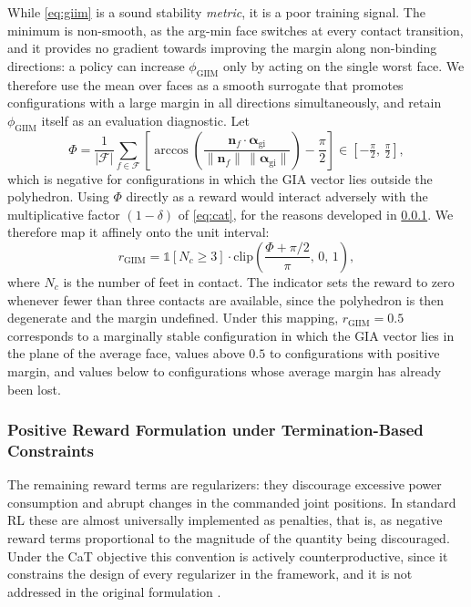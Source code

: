 While \cref{eq:giim} is a sound stability \emph{metric}, it is a poor training signal. The minimum is non-smooth, as the arg-min face switches at every contact transition, and it provides no gradient towards improving the margin along non-binding directions: a policy can increase $\phi_{\text{GIIM}}$ only by acting on the single worst face. We therefore use the mean over faces as a smooth surrogate that promotes configurations with a large margin in all directions simultaneously, and retain $\phi_{\text{GIIM}}$ itself as an evaluation diagnostic. Let
%
\begin{equation}
    \Phi = \frac{1}{|\mathcal{F}|}\sum_{f\in\mathcal{F}}
    \left[
        \arccos\left(
            \frac{\boldsymbol{n}_{f} \cdot \boldsymbol{\alpha}_{\text{gi}}}
                 {\lVert \boldsymbol{n}_{f} \rVert \,\lVert \boldsymbol{\alpha}_{\text{gi}} \rVert}
        \right) - \frac{\pi}{2}
    \right] \in \left[-\tfrac{\pi}{2},\, \tfrac{\pi}{2}\right],
    \label{eq:phi-mean}
\end{equation}
%
which is negative for configurations in which the GIA vector lies outside the polyhedron. Using $\Phi$ directly as a reward would interact adversely with the multiplicative factor $(1-\delta)$ of \cref{eq:cat}, for the reasons developed in \cref{sec:positive-rewards}. We therefore map it affinely onto the unit interval:
%
\begin{equation}
    r_{\text{GIIM}} =
    \mathbb{1}\!\left[N_c \ge 3\right]\cdot
    \mathrm{clip}\!\left(\frac{\Phi + \pi/2}{\pi},\,0,\,1\right),
    \label{eq:giim-rew}
\end{equation}
%
where $N_c$ is the number of feet in contact. The indicator sets the reward to zero whenever fewer than three contacts are available, since the polyhedron is then degenerate and the margin undefined. Under this mapping, $r_{\text{GIIM}}=0.5$ corresponds to a marginally stable configuration in which the GIA vector lies in the plane of the average face, values above $0.5$ to configurations with positive margin, and values below to configurations whose average margin has already been lost.

\subsubsection{Positive Reward Formulation under Termination-Based Constraints}
\label{sec:positive-rewards}

The remaining reward terms are regularizers: they discourage excessive power consumption and abrupt changes in the commanded joint positions. In standard RL these are almost universally implemented as penalties, that is, as negative reward terms proportional to the magnitude of the quantity being discouraged. Under the CaT objective this convention is actively counterproductive, since it constrains the design of every regularizer in the framework, and it is not addressed in the original formulation \citep{chane2024cat}.

